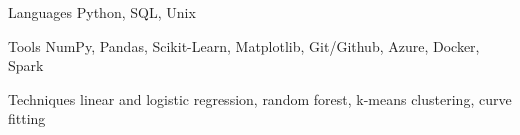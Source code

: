 \begin{cvskills}
  \cvskill
    {Languages}
    {Python, SQL, Unix} %

  \cvskill
    {Tools} %
    {NumPy, Pandas, Scikit-Learn, Matplotlib, Git/Github, Azure, Docker, Spark} %

  \cvskill
    {Techniques} %
    {linear and logistic regression, random forest, k-means clustering, curve
    fitting} %
\end{cvskills}

